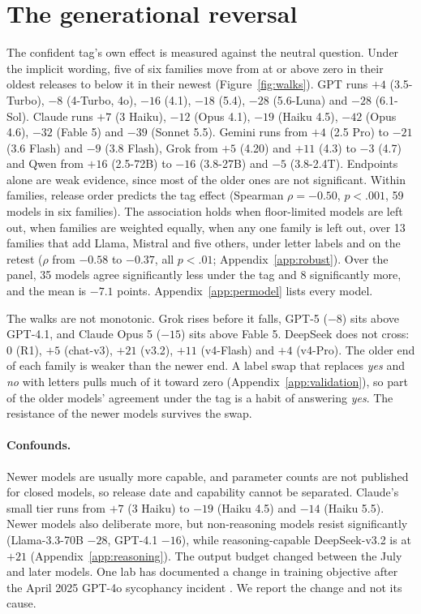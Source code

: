 \section{The generational reversal}
\label{sec:release}

The confident tag's own effect is measured against the neutral question. Under the implicit
wording, five of six families move from at or above zero in their oldest
releases to below it in their newest (Figure~\ref{fig:walks}). GPT runs $+4$ (3.5-Turbo), $-8$
(4-Turbo, 4o), $-16$ (4.1), $-18$ (5.4), $-28$ (5.6-Luna) and $-28$ (6.1-Sol). Claude runs $+7$ (3
Haiku), $-12$ (Opus 4.1), $-19$ (Haiku 4.5), $-42$ (Opus 4.6), $-32$ (Fable 5) and $-39$ (Sonnet 5.5). Gemini runs from
$+4$ (2.5 Pro) to $-21$ (3.6 Flash) and $-9$ (3.8 Flash), Grok from $+5$ (4.20) and $+11$ (4.3) to $-3$ (4.7) and
Qwen from $+16$ (2.5-72B) to $-16$ (3.8-27B) and $-5$ (3.8-2.4T). Endpoints alone are weak evidence,
since most of the older ones are not significant. Within families, release order predicts the tag effect (Spearman $\rho=-0.50$,
$p<.001$, 59 models in six families). The association holds when floor-limited models are left out,
when families are weighted equally, when any one family is left out, over 13 families that add
Llama, Mistral and five others, under letter labels and on the retest ($\rho$ from $-0.58$ to $-0.37$,
all $p<.01$; Appendix~\ref{app:robust}). Over the panel, 35 models agree significantly less under the
tag and 8 significantly more, and the mean is $-7.1$ points. Appendix~\ref{app:permodel} lists every
model.

The walks are not monotonic. Grok rises before it falls, GPT-5 ($-8$) sits above GPT-4.1, and Claude
Opus 5 ($-15$) sits above Fable 5. DeepSeek does not cross: $0$ (R1), $+5$ (chat-v3), $+21$ (v3.2),
$+11$ (v4-Flash) and $+4$ (v4-Pro). The older end of each family is weaker than the newer end. A
label swap that replaces \emph{yes} and \emph{no} with letters pulls much of it toward zero
(Appendix~\ref{app:validation}), so part of the older models' agreement under the tag is a habit of
answering \emph{yes}. The resistance of the newer models survives the swap.

\paragraph{Confounds.} Newer models are usually more capable, and parameter counts are not published
for closed models, so release date and capability cannot be separated. Claude's small tier runs
from $+7$ (3 Haiku) to $-19$ (Haiku 4.5) and $-14$ (Haiku 5.5). Newer models also deliberate more,
but non-reasoning models resist significantly (Llama-3.3-70B $-28$, GPT-4.1 $-16$), while
reasoning-capable DeepSeek-v3.2 is at $+21$ (Appendix~\ref{app:reasoning}). The output budget changed
between the July and later models. One lab has documented a change in training objective after the
April 2025 GPT-4o sycophancy incident \citep{gpt5card}. We report the change and not its cause.

